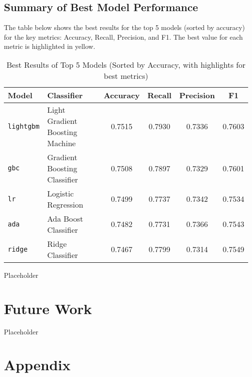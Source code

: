 \documentclass[a4paper,12pt]{article}
\begin{document}
\subsection{Summary of Best Model Performance}



The table below shows the best results for the top 5 models (sorted by accuracy) for the key metrics: Accuracy, Recall, Precision, and F1. The best value for each metric is highlighted in yellow.

\begin{table}[h!]
\centering
\begin{tabular}{l l c c c c}
\toprule
\textbf{Model} & \textbf{Classifier} & \textbf{Accuracy} & \textbf{Recall} & \textbf{Precision} & \textbf{F1} \\
\midrule
\texttt{lightgbm} & Light Gradient Boosting Machine & \cellcolor{yellow}0.7515 & \cellcolor{yellow}0.7930 & 0.7336 & \cellcolor{yellow}0.7603 \\  %
\texttt{gbc}    & Gradient Boosting Classifier & 0.7508 & 0.7897 & 0.7329 & 0.7601 \\  %
\texttt{lr}     & Logistic Regression & 0.7499 & 0.7737 & 0.7342 & 0.7534 \\  %
\texttt{ada}    & Ada Boost Classifier & 0.7482 & 0.7731 & \cellcolor{yellow}0.7366 & 0.7543 \\  %
\texttt{ridge}  & Ridge Classifier & 0.7467 & 0.7799 & 0.7314 & 0.7549 \\  %
\bottomrule
\end{tabular}
\caption{Best Results of Top 5 Models (Sorted by Accuracy, with highlights for best metrics)}
\label{tab:best_model_performance}
\end{table}
Placeholder

\section{Future Work}
Placeholder

\clearpage

\appendix
\section*{Appendix}
\end{document}
